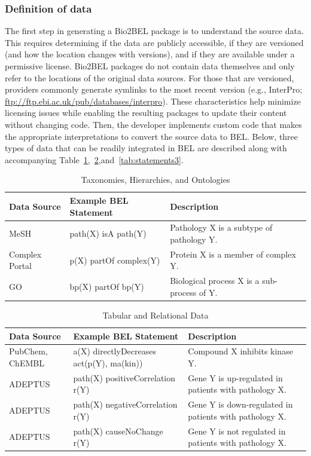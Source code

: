 \subsubsection*{Definition of data}

The first step in generating a Bio2BEL package is to understand the source data.
This requires determining if the data are publicly accessible, if they are versioned (and how the location changes with versions), and if they are available under a permissive license.
Bio2BEL packages do not contain data themselves and only refer to the locations of the original data sources.
For those that are versioned, providers commonly generate symlinks to the most recent version (e.g., InterPro; \url{ftp://ftp.ebi.ac.uk/pub/databases/interpro}).
These characteristics help minimize licensing issues while enabling the resulting packages to update their content without changing code.
Then, the developer implements custom code that makes the appropriate interpretations to convert the source data to BEL.
Below, three types of data that can be readily integrated in BEL are described along with accompanying Table~\ref{tab:statements1},~\ref{tab:statements2},and~\ref{tab:statements3}.

\begin{table}[h!]
\caption{Taxonomies, Hierarchies, and Ontologies}
\label{tab:statements1}
\begin{tabular}{lll}
\hline
  Data Source            & Example BEL Statement                     & Description \\
\hline
  MeSH                   & path(X) isA path(Y)                       & Pathology X is a subtype of pathology Y. \\
  Complex Portal         & p(X) partOf complex(Y)                    & Protein X is a member of complex Y. \\
  GO                     & bp(X) partOf bp(Y)                        & Biological process X is a sub-process of Y. \\
\end{tabular}
\end{table}

\begin{table}[h!]
\caption{Tabular and Relational Data}
\label{tab:statements2}
\begin{tabular}{lll}
\hline
  Data Source            & Example BEL Statement                     & Description \\
\hline
  PubChem, ChEMBL        & a(X) directlyDecreases act(p(Y), ma(kin)) & Compound X inhibits kinase Y. \\
  ADEPTUS                & path(X) positiveCorrelation r(Y) & Gene Y is up-regulated in patients with pathology X. \\
  ADEPTUS                & path(X) negativeCorrelation r(Y) & Gene Y is down-regulated in patients with pathology X. \\
  ADEPTUS                & path(X) causeNoChange r(Y) & Gene Y is not regulated in patients with pathology X. \\
\end{tabular}
\end{table}

